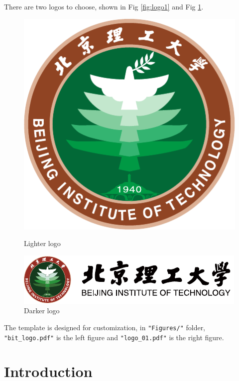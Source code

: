 \documentclass[12pt,english, openany]{book}
\begin{document}
There are two logos to choose, shown in Fig \ref{fig:logo1} and Fig \ref{fig:logo2}. 
\begin{figure}[ht]
	\centering
	\begin{minipage}[c]{0.4\linewidth}
		\includegraphics[width=0.9\linewidth]{Figures/bit_logo.pdf}
		\caption{Lighter logo}
		\label{fig:logo1}
	\end{minipage}
	\hspace{1.4cm}
	\begin{minipage}[c]{0.4\linewidth}
		\includegraphics[width=0.9\linewidth]{Figures/logo_01.pdf}
		\caption{Darker logo}
		\label{fig:logo2}
	\end{minipage}%
\end{figure}

The template is designed for customization, in \texttt{"Figures/"} folder, \texttt{"bit\_logo.pdf"} is the left figure and \texttt{"logo\_01.pdf"} is the right figure.

\chapter{Introduction}\label{chapt:intro}
\end{document}
